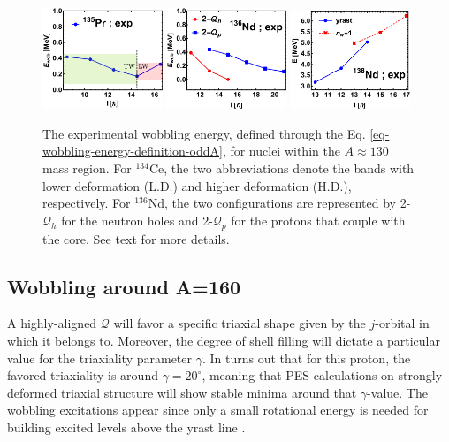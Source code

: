 \begin{figure}
    \includegraphics[width=0.32\textwidth]{Chapters/Figures/wobblers/135Pr-edited.pdf}
    \includegraphics[width=0.32\textwidth]{Chapters/Figures/wobblers/136Nd-joint.pdf}
    \includegraphics[width=0.32\textwidth]{Chapters/Figures/wobblers/138Nd.pdf}
    \caption{The experimental wobbling energy, defined through the Eq. \ref{eq-wobbling-energy-definition-oddA}, for nuclei within the $A\approx 130$ mass region. For $^{134}$Ce, the two abbreviations denote the bands with lower deformation (L.D.) and higher deformation (H.D.), respectively. For $^{136}$Nd, the two configurations are represented by 2-$\mathcal{Q}_h$ for the neutron holes and 2-$\mathcal{Q}_p$ for the protons that couple with the core. See text for more details.}
    \label{wobblers-exp-set2}
\end{figure}

\subsection{Wobbling around A=160}

A highly-aligned $\mathcal{Q}$ will favor a specific triaxial shape \cite{hamamoto1983intrinsic} given by the $j$-orbital in which it belongs to. Moreover, the degree of shell filling will dictate a particular value for the triaxiality parameter $\gamma$. In turns out that for this proton, the favored triaxiality is around $\gamma=20^\circ$, meaning that PES calculations on strongly deformed triaxial structure will show stable minima around that $\gamma$-value. The wobbling excitations appear since only a small rotational energy is needed for building excited levels above the yrast line \cite{hamamoto2016interplay}.

